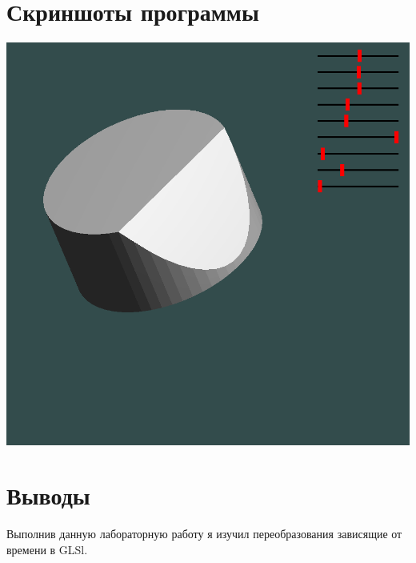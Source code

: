 \section{Скриншоты программы}
\includegraphics[scale=0.5]{L4-5_1.png}
\section{Выводы}
Выполнив данную лабораторную работу я изучил переобразования зависящие от времени в GLSl.
\pagebreak
